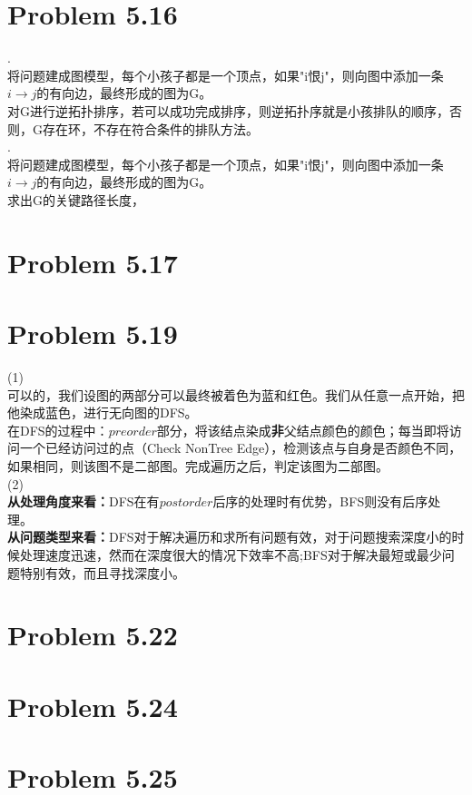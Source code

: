 \documentclass[twocolumn]{ctexart}
\begin{document}
\section*{Problem 5.16}
.\\
\indent 将问题建成图模型，每个小孩子都是一个顶点，如果"i恨j"，则向图中添加一条$i\rightarrow j$的有向边，最终形成的图为G。\\
\indent
对G进行逆拓扑排序，若可以成功完成排序，则逆拓扑序就是小孩排队的顺序，否则，G存在环，不存在符合条件的排队方法。\\

.\\
\indent 将问题建成图模型，每个小孩子都是一个顶点，如果"i恨j"，则向图中添加一条$i\rightarrow j$的有向边，最终形成的图为G。\\
\indent
求出G的关键路径长度，
\section*{Problem 5.17}
 


\section*{Problem 5.19}
\noindent (1)\\
\indent 可以的，我们设图的两部分可以最终被着色为蓝和红色。我们从任意一点开始，把他染成蓝色，进行无向图的DFS。\\
\indent 在DFS的过程中：$preorder$部分，将该结点染成\textbf{非}父结点颜色的颜色；每当即将访问一个已经访问过的点（Check NonTree Edge），检测该点与自身是否颜色不同，如果相同，则该图不是二部图。完成遍历之后，判定该图为二部图。\\
\noindent (2)\\
\indent \textbf{从处理角度来看：}DFS在有$post order$后序的处理时有优势，BFS则没有后序处理。\\
\indent \textbf{从问题类型来看：}DFS对于解决遍历和求所有问题有效，对于问题搜索深度小的时候处理速度迅速，然而在深度很大的情况下效率不高;BFS对于解决最短或最少问题特别有效，而且寻找深度小。\\
\section*{Problem 5.22}

\section*{Problem 5.24}

\section*{Problem 5.25}
\end{document}
